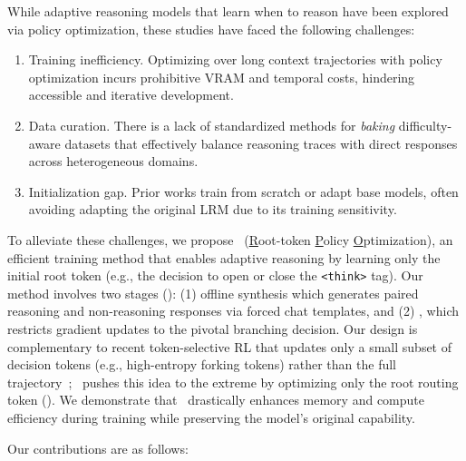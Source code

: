While adaptive reasoning models that learn when to reason have been explored via policy optimization, these studies have faced the following challenges:

\begin{enumerate}[leftmargin=12pt, itemsep=2pt]
    \item Training inefficiency. Optimizing over long context trajectories with policy optimization incurs prohibitive VRAM and temporal costs, hindering accessible and iterative development.

    \item Data curation. There is a lack of standardized methods for \textit{baking} difficulty-aware datasets that effectively balance reasoning traces with direct responses across heterogeneous domains.

    \item Initialization gap. Prior works train from scratch or adapt base models, often avoiding adapting the original LRM due to its training sensitivity.
    

\end{enumerate}

To alleviate these challenges, we propose \Ours~(\underline{R}oot-token \underline{P}olicy \underline{O}ptimization), an efficient training method that enables adaptive reasoning by learning only the initial root token (e.g., the decision to open or close the \texttt{<think>} tag). Our method involves two stages (): (1) offline synthesis which generates paired reasoning and non-reasoning responses via forced chat templates, and (2) \Ours, which restricts gradient updates to the pivotal branching decision. 
Our design is complementary to recent token-selective RL that updates only a small subset of decision tokens (e.g., high-entropy forking tokens) rather than the full trajectory~\cite{wang2025beyond8020}; \Ours~pushes this idea to the extreme by optimizing only the root routing token (). 
We demonstrate that \Ours~drastically enhances memory and compute efficiency during training while preserving the model's original capability. 

Our contributions are as follows:

